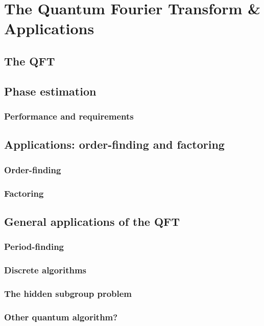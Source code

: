 \documentclass{book}
\theoremstyle{definition}
\begin{document}



\newpage


\section{The Quantum Fourier Transform \& Applications}


\subsection{The QFT}
\subsection{Phase estimation}
\subsubsection{Performance and requirements}
\subsection{Applications: order-finding and factoring}
\subsubsection{Order-finding}
\subsubsection{Factoring}
\subsection{General applications of the QFT}
\subsubsection{Period-finding}
\subsubsection{Discrete algorithms}
\subsubsection{The hidden subgroup problem}
\subsubsection{Other quantum algorithm?}
\end{document}
